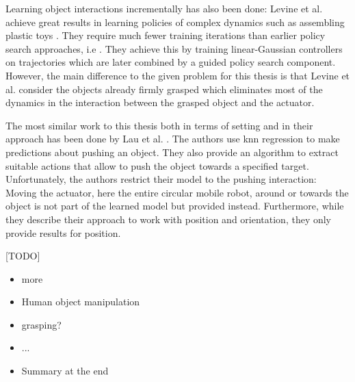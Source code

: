 Learning object interactions incrementally has also been done:
Levine et al. achieve great results in learning policies of complex dynamics  %
such as assembling plastic toys \cite{levine2015learning}. They require much fewer training iterations than earlier policy search approaches, i.e \cite{otherPolicySearchs}. They achieve this by training linear-Gaussian controllers on trajectories which are later combined by a guided policy search component.
However, the main difference to the given problem for this thesis is that Levine et al. consider the objects already firmly grasped which eliminates most of the dynamics in the interaction between the grasped object and the actuator.

The most similar work to this thesis both in terms of setting and in their approach has been done by 
Lau et al. \cite{pushing}. The authors use \gls{knn} regression to make predictions about pushing an object. They also provide an algorithm to extract suitable actions that allow to push the object towards a specified target. Unfortunately, the authors restrict their model to the pushing interaction: Moving the actuator, here the entire circular mobile robot, around or towards the object is not part of the learned model but provided instead. Furthermore, while they describe their approach to work with position and orientation, they only provide results for position. 


[TODO]
\begin{itemize}
\item more
\item Human object manipulation
\item grasping?
\item ...
\item Summary at the end
\end{itemize}

